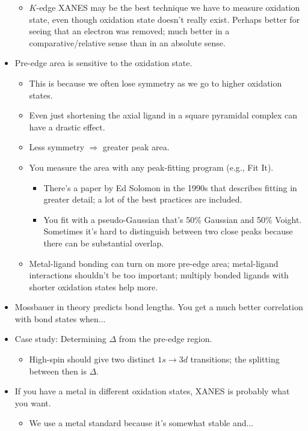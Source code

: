 \documentclass[../notes.tex]{subfiles}
\begin{document}
\begin{itemize}
\begin{itemize}
        \item $K$-edge XANES may be the best technique we have to measure oxidation state, even though oxidation state doesn't really exist. Perhaps better for seeing that an electron was removed; much better in a comparative/relative sense than in an absolute sense.
    \end{itemize}
    \item Pre-edge area is sensitive to the oxidation state.
    \begin{itemize}
        \item This is because we often lose symmetry as we go to higher oxidation states.
        \item Even just shortening the axial ligand in a square pyramidal complex can have a drastic effect.
        \item Less symmetry $\Rightarrow$ greater peak area.
        \item You measure the area with any peak-fitting program (e.g., Fit It).
        \begin{itemize}
            \item There's a paper by Ed Solomon in the 1990s that describes fitting in greater detail; a lot of the best practices are included.
            \item You fit with a pseudo-Gaussian that's 50\% Gaussian and 50\% Voight. Sometimes it's hard to distinguish between two close peaks because there can be substantial overlap.
        \end{itemize}
        \item Metal-ligand bonding can turn on more pre-edge area; metal-ligand interactions shouldn't be too important; multiply bonded ligands with shorter oxidation states help more.
    \end{itemize}
    \item Mossbauer in theory predicts bond lengths. You get a much better correlation with bond states when...
    \item Case study: Determining $\Delta$ from the pre-edge region.
    \begin{itemize}
        \item High-spin  should give two distinct $1s\to 3d$ transitions; the splitting between then is $\Delta$.
    \end{itemize}
    \item If you have a metal in different oxidation states, XANES is probably what you want.
    \begin{itemize}
        \item We use a metal standard because it's somewhat stable and...

\end{itemize}
\end{itemize}
\end{document}
